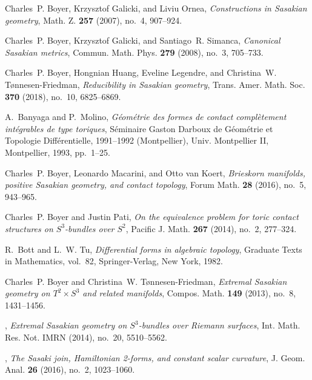 \documentclass[12pt]{amsart}
\begin{document}
\begin{thebibliography}{ACGTF08}
Charles~P. Boyer, Krzysztof Galicki, and Liviu Ornea, \emph{Constructions in
  {S}asakian geometry}, Math. Z. \textbf{257} (2007), no.~4, 907--924.

Charles~P. Boyer, Krzysztof Galicki, and Santiago~R. Simanca, \emph{Canonical
  {S}asakian metrics}, Commun. Math. Phys. \textbf{279} (2008), no.~3,
  705--733. 

Charles~P. Boyer, Hongnian Huang, Eveline Legendre, and Christina~W.
  T{\o}nnesen-Friedman, \emph{Reducibility in {S}asakian geometry}, Trans.
  Amer. Math. Soc. \textbf{370} (2018), no.~10, 6825--6869. 

A.~Banyaga and P.~Molino, \emph{G\'eom\'etrie des formes de contact
  compl\`etement int\'egrables de type toriques}, S\'eminaire Gaston Darboux de
  G\'eom\'etrie et Topologie Diff\'erentielle, 1991--1992 (Montpellier), Univ.
  Montpellier II, Montpellier, 1993, pp.~1--25. 

Charles~P. Boyer, Leonardo Macarini, and Otto van Koert, \emph{Brieskorn
  manifolds, positive {S}asakian geometry, and contact topology}, Forum Math.
  \textbf{28} (2016), no.~5, 943--965. 

Charles~P. Boyer and Justin Pati, \emph{On the equivalence problem for toric
  contact structures on {$S^3$}-bundles over {$S^2$}}, Pacific J. Math.
  \textbf{267} (2014), no.~2, 277--324. 

R.~Bott and L.~W. Tu, \emph{Differential forms in algebraic topology}, Graduate
  Texts in Mathematics, vol.~82, Springer-Verlag, New York, 1982. 

Charles~P. Boyer and Christina~W. T{\o}nnesen-Friedman, \emph{Extremal
  {S}asakian geometry on {$T^2\times S^3$} and related manifolds}, Compos.
  Math. \textbf{149} (2013), no.~8, 1431--1456. 

\bysame, \emph{Extremal {S}asakian geometry on {$S^3$}-bundles over {R}iemann
  surfaces}, Int. Math. Res. Not. IMRN (2014), no.~20, 5510--5562. 

\bysame, \emph{The {S}asaki join, {H}amiltonian 2-forms, and constant scalar
  curvature}, J. Geom. Anal. \textbf{26} (2016), no.~2, 1023--1060.


\end{thebibliography}
\end{document}
